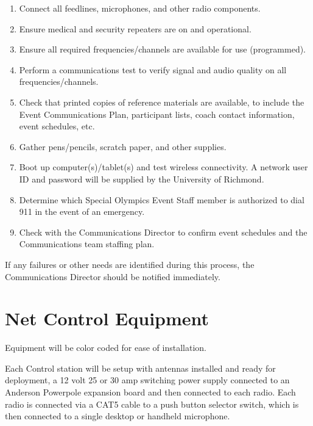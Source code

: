 \documentclass[pdflatex,letterpaper,twoside,12pt]{book}
\begin{document}
\begin{enumerate}
	\item Connect all feedlines, microphones, and other radio components.
  \item Ensure medical and security repeaters are on and operational.
	\item Ensure all required frequencies/channels are available for use (programmed).
	\item Perform a communications test to verify signal and audio quality on all frequencies/channels.
	\item Check that printed copies of reference materials are available, to include the Event Communications Plan, participant lists, coach contact information, event schedules, etc. %
	\item Gather pens/pencils, scratch paper, and other supplies.
	\item Boot up computer(s)/tablet(s) and test wireless connectivity.  A network user ID and password will be supplied by the University of Richmond.
	\item Determine which Special Olympics Event Staff member is authorized to dial 911 in the event of an emergency.
	\item Check with the Communications Director to confirm event schedules and the Communications team staffing plan.
\end{enumerate}

If any failures or other needs are identified during this process, the Communications Director should be notified immediately.


\section{Net Control Equipment}

Equipment will be color coded for ease of installation.

Each Control station will be setup with antennas installed and ready for deployment, a 12 volt 25 or 30 amp switching power supply connected to an Anderson Powerpole expansion board and then connected to each radio. Each radio is connected via a CAT5 cable to a push button selector switch, which is then connected to a single desktop or handheld microphone.
\end{document}
